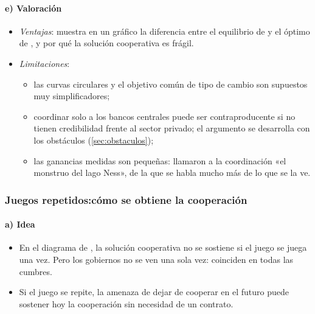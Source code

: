 \documentclass[11pt]{article}
\begin{document}
\paragraph{e) Valoración}
\begin{itemize}
\item \emph{Ventajas}: muestra en un gráfico la diferencia entre el equilibrio de  y el óptimo de , y por qué la solución cooperativa es frágil.
\item \emph{Limitaciones}:
  \begin{itemize}
  \item las curvas circulares y el objetivo común de tipo de cambio son supuestos muy simplificadores;
  \item coordinar solo a los bancos centrales puede ser contraproducente si no tienen credibilidad frente al sector privado\nocite{Rogoff1985Counterproductive}; el argumento se desarrolla con los obstáculos (\ref{sec:obstaculos});
  \item las ganancias medidas son pequeñas: \textcite{BlanchardOstryGhosh2013} llamaron a la coordinación «el monstruo del lago Ness», de la que se habla mucho más de lo que se la ve.
  \end{itemize}
\end{itemize}

\subsubsection{Juegos repetidos:\cortetitulo cómo se obtiene la cooperación}\label{sec:repeticion}

\paragraph{a) Idea}
\begin{itemize}
\item En el diagrama de , la solución cooperativa no se sostiene si el juego se juega una vez. Pero los gobiernos no se ven una sola vez: coinciden en todas las cumbres.
\item Si el juego se repite, la amenaza de dejar de cooperar en el futuro puede sostener hoy la cooperación sin necesidad de un contrato.
\end{itemize}
\end{document}
